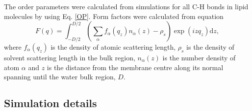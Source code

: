 \documentclass[aip,jcp,twocolumn]{revtex4}
\begin{document}
The order parameters were calculated from simulations for all C-H bonds
in lipid molecules by using Eq. \ref{OP}. Form factors were calculated 
from equation 
\begin{equation}
  F(q) = \int _{-D/2} ^{D/2} \left ( \sum _\alpha f_\alpha (q_z) n_\alpha (z) - \rho _s \right ) \exp (izq_z) \mathrm{d}z,
\end{equation}
where $f_\alpha(q_z)$ is the density of atomic scattering length, 
$\rho_s$ is the density of solvent scattering length in the bulk region,
$n_\alpha (z)$ is the number density of atom $\alpha$ and
$z$ is the distance from the membrane centre along its normal 
spanning until the water bulk region, $D$. 




\subsection{Simulation details}
\end{document}
